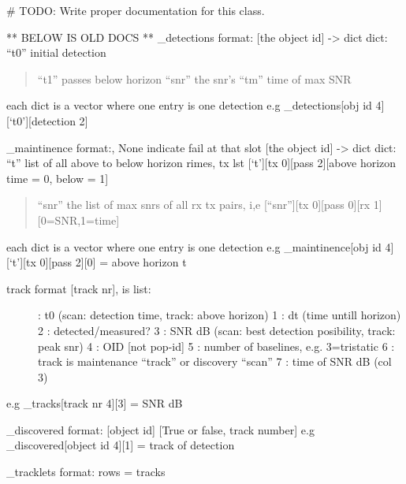 \documentclass[letterpaper,10pt,english]{sphinxmanual}
\begin{document}
\begin{fulllineitems}
\label{\detokenize{modules/catalogue:catalogue.Catalogue}}
\# TODO: Write proper documentation for this class.

** BELOW IS OLD DOCS **
\_detections format:
{[}the object id{]} -\textgreater{} dict
dict: “t0” initial detection
\begin{quote}

“t1” passes below horizon
“snr” the snr’s
“tm” time of max SNR
\end{quote}

each dict is a vector where one entry is one detection
e.g \_detections{[}obj id 4{]}{[}‘t0’{]}{[}detection 2{]}

\_maintinence format:, None indicate fail at that slot
{[}the object id{]} -\textgreater{} dict
dict: “t” list of all above to below horizon rimes, tx lst {[}‘t’{]}{[}tx 0{]}{[}pass 2{]}{[}above horizon time = 0, below = 1{]}
\begin{quote}

“snr” the list of max snrs of all rx tx pairs, i,e {[}“snr”{]}{[}tx 0{]}{[}pass 0{]}{[}rx 1{]}{[}0=SNR,1=time{]}
\end{quote}

each dict is a vector where one entry is one detection
e.g \_maintinence{[}obj id 4{]}{[}‘t’{]}{[}tx 0{]}{[}pass 2{]}{[}0{]} = above horizon t
\begin{description}
\item[{track format {[}track nr{]}, is list:}]  : t0 (scan: detection time, track: above horizon)
1 : dt (time untill horizon)
2 : detected/measured?
3 : SNR dB (scan: best detection posibility, track: peak snr)
4 : OID {[}not pop-id{]}
5 : number of baselines, e.g. 3=tristatic
6 : track is maintenance “track” or discovery “scan”
7 : time of SNR dB (col 3)

\end{description}

e.g \_tracks{[}track nr 4{]}{[}3{]} = SNR dB

\_discovered format:
{[}object id{]}
{[}True or false, track number{]}
e.g \_discovered{[}object id 4{]}{[}1{]} = track of detection

\_tracklets
format: rows = tracks
\begin{quote}


\end{quote}
\end{fulllineitems}
\end{document}
